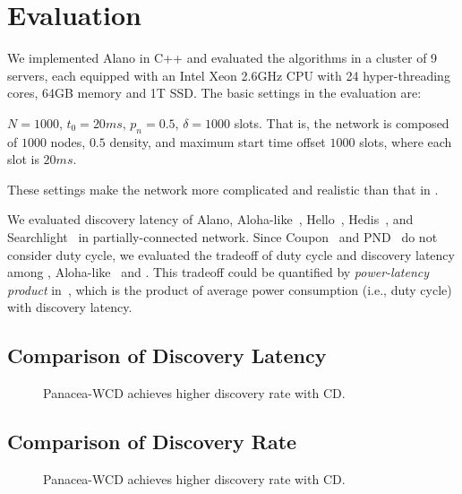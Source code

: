 \section{Evaluation}
\label{Evaluation}

We implemented Alano in C++ and evaluated the algorithms in a cluster of 9 servers, each equipped with an Intel Xeon 2.6GHz CPU with 24 hyper-threading cores, 64GB memory and 1T SSD. The basic settings in the evaluation are: 


$N=1000$, $t_0=20ms$, $p_n=0.5$, $\delta=1000$ slots. That is, the network is composed of $1000$ nodes, $0.5$ density, and maximum start time offset $1000$ slots, where each slot is $20 ms$. 

These settings make the network more complicated and realistic than that in \cite{Kandhalu2010, Sun2014b, Qiu2016, Chen2015, Bakht2012, McGlynn2001, Vasudevan2009, Jiang2005, Dutta2008, You2011, Song2014}.

We evaluated discovery latency of Alano, Aloha-like~\cite{You2011}, Hello~\cite{Sun2014b}, Hedis~\cite{}, and Searchlight~\cite{} in partially-connected network. Since Coupon~\cite{Vasudevan2009} and PND~\cite{Song2014} do not consider duty cycle, we evaluated the tradeoff of duty cycle and discovery latency among \Panacea, Aloha-like~\cite{You2011} and .
This tradeoff could be quantified by \emph{power-latency product} in~\cite{Kandhalu2010}, which is the product of average power consumption (i.e., duty cycle) with discovery latency.

\subsection{Comparison of Discovery Latency}
\begin{figure}[!t]
\centering
{}
\hspace{0.01in}
\caption{Panacea-WCD achieves higher discovery rate with CD.}
\label{fig_timerate}
\end{figure}

\subsection{Comparison of Discovery Rate}

\begin{figure}[!t]
\centering
{}
\hspace{0.01in}
\caption{Panacea-WCD achieves higher discovery rate with CD.}
\label{fig_timerate}
\end{figure}


